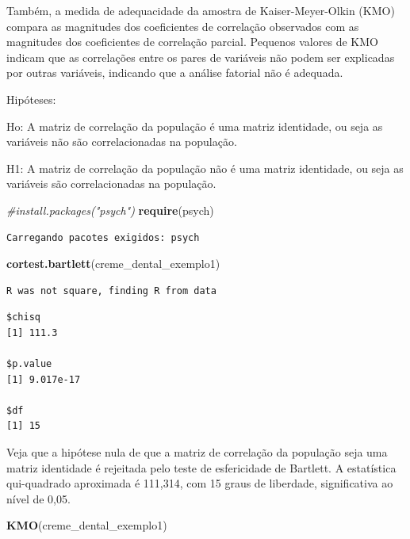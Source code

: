 \documentclass[12pt,brazil,oneside]{book}
\newenvironment{Shaded}{\begin{snugshade}}{\end{snugshade}}
\newcommand{\CommentTok}[1]{\textcolor[rgb]{0.56,0.35,0.01}{\textit{#1}}}
\newcommand{\KeywordTok}[1]{\textcolor[rgb]{0.13,0.29,0.53}{\textbf{#1}}}
\newcommand{\NormalTok}[1]{#1}
\begin{document}
Também, a medida de adequacidade da amostra de Kaiser-Meyer-Olkin (KMO)
compara as magnitudes dos coeficientes de correlação observados com as
magnitudes dos coeficientes de correlação parcial. Pequenos valores de
KMO indicam que as correlações entre os pares de variáveis não podem ser
explicadas por outras variáveis, indicando que a análise fatorial não é
adequada.

Hipóteses:

Ho: A matriz de correlação da população é uma matriz identidade, ou seja
as variáveis não são correlacionadas na população.

H1: A matriz de correlação da população não é uma matriz identidade, ou
seja as variáveis são correlacionadas na população.

\begin{Shaded}
\begin{Highlighting}[]
\CommentTok{#install.packages("psych")}
\KeywordTok{require}\NormalTok{(psych)}
\end{Highlighting}
\end{Shaded}

\begin{verbatim}
Carregando pacotes exigidos: psych
\end{verbatim}

\begin{Shaded}
\begin{Highlighting}[]
\KeywordTok{cortest.bartlett}\NormalTok{(creme_dental_exemplo1)}
\end{Highlighting}
\end{Shaded}

\begin{verbatim}
R was not square, finding R from data
\end{verbatim}

\begin{verbatim}
$chisq
[1] 111.3

$p.value
[1] 9.017e-17

$df
[1] 15
\end{verbatim}

Veja que a hipótese nula de que a matriz de correlação da população seja
uma matriz identidade é rejeitada pelo teste de esfericidade de
Bartlett. A estatística qui-quadrado aproximada é 111,314, com 15 graus
de liberdade, significativa ao nível de 0,05.

\begin{Shaded}
\begin{Highlighting}[]
\KeywordTok{KMO}\NormalTok{(creme_dental_exemplo1)}
\end{Highlighting}
\end{Shaded}
\end{document}
